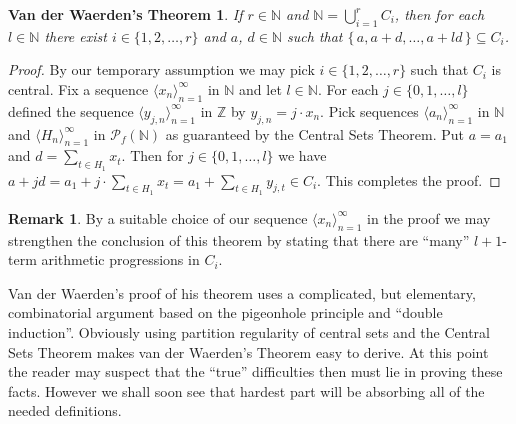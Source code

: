 \documentclass[12pt]{article}
\theoremstyle{plain}
\newtheorem{vdw}[thm]{Van der Waerden's Theorem}
\theoremstyle{definition}
\newtheorem{rmk}[thm]{Remark}
\newcommand{\la}{\langle}
\newcommand{\ra}{\rangle}
\newcommand{\bbN}{\mathbb{N}}
\newcommand{\bbZ}{\mathbb{Z}}
\newcommand{\Pf}{\mathcal{P}_f}
\begin{document}
\begin{vdw}
  If $r \in \bbN$ and $\bbN = \bigcup_{i=1}^r C_i$, then for each $l
  \in \bbN$ there exist $i \in \{1, 2, \ldots, r\}$ and $a$, $d \in
  \bbN$ such that $\{\, a, a+d, \ldots, a+ld \,\} \subseteq C_i$.
\end{vdw}
\begin{proof}
  By our temporary assumption we may pick $i \in \{1, 2, \ldots, r\}$
  such that $C_i$ is central. 
  Fix a sequence $\la x_n \ra_{n=1}^\infty$ in $\bbN$ and let $l \in
  \bbN$.
  For each $j \in \{0, 1, \ldots, l\}$ defined the sequence $\la
  y_{j,n} \ra_{n=1}^\infty$ in $\bbZ$ by $y_{j,n} = j \cdot x_n$. 
  Pick sequences $\la a_n \ra_{n=1}^\infty$ in $\bbN$ and $\la H_n
  \ra_{n=1}^\infty$ in $\Pf(\bbN)$ as guaranteed by the Central Sets
  Theorem. 
  Put $a = a_1$ and $d = \sum_{t \in H_1} x_t$. 
  Then for $j \in \{0, 1, \ldots, l\}$ we have $a+jd = a_1 +
  j\cdot\sum_{t \in H_1} x_t = a_1 + \sum_{t \in H_1} y_{j,t} \in C_i$.
  This completes the proof.
\end{proof}
\begin{rmk}
  By a suitable choice of our sequence $\la x_n \ra_{n=1}^\infty$ in
  the proof we may strengthen the conclusion of this theorem by
  stating that there are ``many'' $l+1$-term arithmetic progressions
  in $C_i$. 
\end{rmk}

Van der Waerden's proof of his theorem \cite{Van-der-Waerden:1927fk}
uses a complicated, but elementary, combinatorial argument based on
the pigeonhole principle and ``double induction''.%
Obviously using partition regularity of central sets and the Central
Sets Theorem makes van der Waerden's Theorem easy to derive.
At this point the reader may suspect that the ``true'' difficulties
then must lie in proving these facts. 
However we shall soon see that hardest part will be absorbing all of
the needed definitions. 
\end{document}

